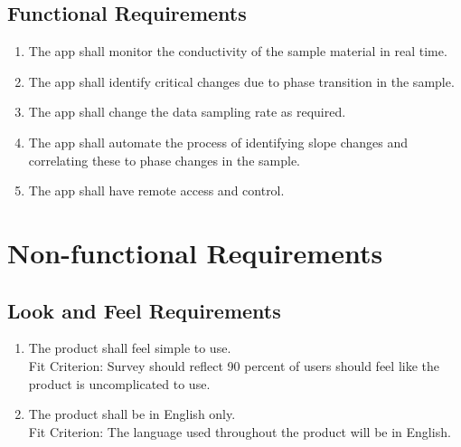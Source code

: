 \documentclass[12pt, titlepage]{article}
\begin{document}
\subsection{Functional Requirements}
\begin{enumerate}[{FR}1.] 
    \item
    The app shall monitor the conductivity of the sample material in real time. 
    \item
    The app shall identify critical changes due to phase transition in the sample.
    \item
    The app shall change the data sampling rate as required.
    \item
    The app shall automate the process of identifying slope changes and correlating these to phase changes in the sample. 
    \item
    The app shall have remote access and control. \\
	
\end{enumerate}

\section{Non-functional Requirements}


\subsection{Look and Feel Requirements}
\begin{adjustwidth}{2.2em}{0pt}
\begin{enumerate}[{NFR-L}1.]
   \item The product shall feel simple to use.\\
   Fit Criterion: Survey should reflect 90 percent of users should feel like the product is uncomplicated to use.
   \item The product shall be in English only.\\
   Fit Criterion: The language used throughout the product will be in English.
\end{enumerate}
\end{adjustwidth}
 
\end{document}
